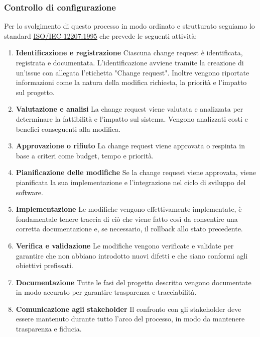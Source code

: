 \subsubsection{Controllo di configurazione}
Per lo svolgimento di questo processo in modo ordinato e strutturato seguiamo lo standard
\href{https://www.math.unipd.it/~tullio/IS-1/2009/Approfondimenti/ISO_12207-1995.pdf}{\underline{ISO/IEC 12207:1995}}
che prevede le seguenti attività:
\begin{enumerate}
	\item \textbf{Identificazione e registrazione} Ciascuna change request è identificata, registrata e documentata. L'identificazione avviene
	      tramite la creazione di un'issue con allegata l'etichetta "Change request".
	      Inoltre vengono riportate informazioni come la natura della modifica richiesta, la priorità e l'impatto sul progetto.
	\item \textbf{Valutazione e analisi} La change request viene valutata e analizzata per determinare la fattibilità e l'impatto sul
	      sistema. Vengono analizzati costi e benefici conseguenti alla modifica.
	\item \textbf{Approvazione o rifiuto} La change request viene approvata o respinta in base a criteri come budget, tempo e priorità.
	\item \textbf{Pianificazione delle modifiche} Se la change request viene approvata, viene pianificata la sua implementazione e l'integrazione
	      nel ciclo di sviluppo del software.
	\item \textbf{Implementazione} Le modifiche vengono effettivamente implementate, è fondamentale tenere traccia di ciò che viene fatto così
	      da consentire una corretta documentazione e, se necessario, il rollback allo stato precedente.
	\item \textbf{Verifica e validazione} Le modifiche vengono verificate e validate per garantire che non abbiano introdotto nuovi difetti
	      e che siano conformi agli obiettivi prefissati.
	\item \textbf{Documentazione} Tutte le fasi del progetto descritto vengono documentate in modo accurato per garantire trasparenza e
	      tracciabilità.
	\item \textbf{Comunicazione agli stakeholder} Il confronto con gli stakeholder deve essere mantenuto
	      durante tutto l'arco del processo, in modo da mantenere trasparenza e fiducia.
\end{enumerate}

